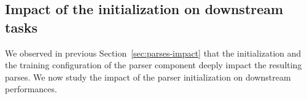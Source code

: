 \subsection{Impact of the initialization on downstream tasks} %
\label{sec:dowstream-impact}

We observed in previous Section~\ref{sec:parses-impact} that the initialization and the training configuration of the parser component deeply impact the resulting parses. We now study the impact of the parser initialization on downstream performances.


